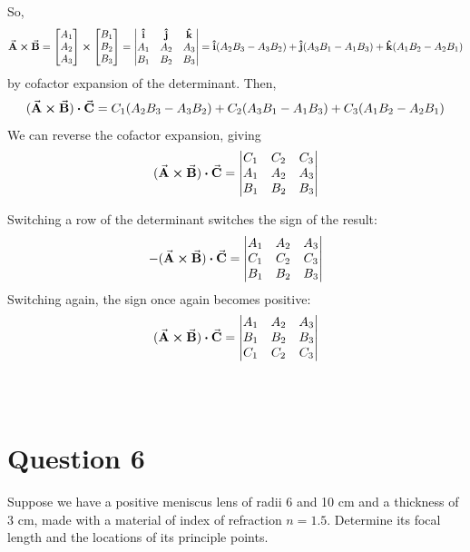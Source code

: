 \documentclass[a4paper]{article}
\begin{document}
So,
$$ \va{A} \cross \va{B} = \begin{bmatrix}
    A_1 \\
    A_2 \\
    A_3 \\
\end{bmatrix} \cross
\begin{bmatrix}
    B_1 \\
    B_2 \\
    B_3 \\
\end{bmatrix} = \begin{vmatrix}
    \vu{i} & \vu{j} & \vu{k} \\
    A_1 & A_2 & A_3 \\
    B_1 & B_2 & B_3 \\
    \end{vmatrix} = \vu{i}(A_2 B_3 - A_3 B_2) + \vu{j}(A_3 B_1 - A_1 B_3) + \vu{k}(A_1 B_2 - A_2 B_1) $$
by cofactor expansion of the determinant.
Then, 
$$(\va{A} \cross \va{B}) \vdot \va{C} = C_1 (A_2 B_3 - A_3 B_2) + C_2 (A_3 B_1 - A_1 B_3) + C_3 (A_1 B_2 - A_2 B_1)$$
We can reverse the cofactor expansion, giving
$$ (\va{A} \cross \va{B}) \vdot \va{C} = 
    \begin{vmatrix}
    C_1 & C_2 & C_3 \\
    A_1 & A_2 & A_3 \\
    B_1 & B_2 & B_3 \\
    \end{vmatrix}$$

Switching a row of the determinant switches the sign of the result:
$$ -(\va{A} \cross \va{B}) \vdot \va{C} = 
    \begin{vmatrix}
    A_1 & A_2 & A_3 \\
    C_1 & C_2 & C_3 \\
    B_1 & B_2 & B_3 \\
    \end{vmatrix}$$
Switching again, the sign once again becomes positive:
$$ (\va{A} \cross \va{B}) \vdot \va{C} = 
    \begin{vmatrix}
    A_1 & A_2 & A_3 \\
    B_1 & B_2 & B_3 \\
    C_1 & C_2 & C_3 
    \end{vmatrix}  $$ \\\\


\section*{Question 6}
Suppose we have a positive meniscus lens of radii 6 and 10 cm and a thickness of 3 cm, made with
a material of index of refraction $n = 1.5$. Determine its focal length and the locations of its principle
points.\\\\
\end{document}
